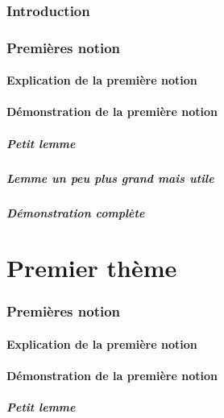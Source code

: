\documentclass[a4paper,autre]{../texmf/tex/latex/insa/insa}
\begin{document}
	\maketitle
	\tableofcontents
	
	\section{Introduction}
		\lipsum[1-10]
	\section{Premières notion}
		\lipsum[1-2]
		\subsection{Explication de la première notion}
			\lipsum[1-5]
		\subsection{Démonstration de la première notion}
			\subsubsection{Petit lemme}
				\lipsum[1-2]
			\subsubsection{Lemme un peu plus grand mais utile}
				\lipsum[1-4]
			\subsubsection{Démonstration complète}
				\lipsum[1-5]
	
	\part{Premier thème}
		\section{Premières notion}
			\lipsum[1-2]
			\subsection{Explication de la première notion}
				\lipsum[1-5]
			\subsection{Démonstration de la première notion}
				\subsubsection{Petit lemme}
					\lipsum[1-2]
\end{document}
